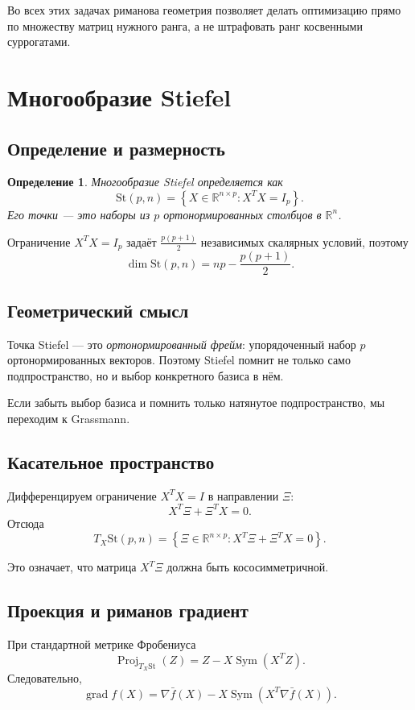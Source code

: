 \documentclass[12pt,a4paper]{article}
\theoremstyle{rudef}
\newtheorem{definition}{Определение}[section]
\theoremstyle{ruplain}
\newcommand{\R}{\mathbb{R}}
\newcommand{\grad}{\operatorname{grad}}
\newcommand{\Sym}{\operatorname{Sym}}
\newcommand{\Proj}{\operatorname{Proj}}
\newcommand{\St}{\mathrm{St}}
\newcommand{\set}[1]{\left\{#1\right\}}
\begin{document}
Во всех этих задачах риманова геометрия позволяет делать оптимизацию прямо по множеству матриц нужного ранга, а не штрафовать ранг косвенными суррогатами.

\section{Многообразие Stiefel}

\subsection{Определение и размерность}

\begin{definition}
Многообразие Stiefel определяется как
\[
\St(p,n)=\set{X\in \R^{n\times p}: X^TX=I_p}.
\]
Его точки --- это наборы из $p$ ортонормированных столбцов в $\R^n$.
\end{definition}

Ограничение $X^TX=I_p$ задаёт $\frac{p(p+1)}{2}$ независимых скалярных условий, поэтому
\[
\dim \St(p,n)=np-\frac{p(p+1)}{2}.
\]

\subsection{Геометрический смысл}

Точка Stiefel --- это \emph{ортонормированный фрейм}: упорядоченный набор $p$ ортонормированных векторов. Поэтому Stiefel помнит не только само подпространство, но и выбор конкретного базиса в нём.

Если забыть выбор базиса и помнить только натянутое подпространство, мы переходим к Grassmann.

\subsection{Касательное пространство}

Дифференцируем ограничение $X^TX=I$ в направлении $\Xi$:
\[
X^T\Xi + \Xi^T X = 0.
\]
Отсюда
\[
\boxed{\ T_X\St(p,n)=\set{\Xi\in \R^{n\times p}: X^T\Xi + \Xi^TX = 0}.\ }
\]

Это означает, что матрица $X^T\Xi$ должна быть кососимметричной.

\subsection{Проекция и риманов градиент}

При стандартной метрике Фробениуса
\[
\Proj_{T_X\St}(Z)=Z-X\Sym(X^TZ).
\]
Следовательно,
\[
\grad f(X)=\nabla \bar f(X)-X\Sym(X^T\nabla \bar f(X)).
\]
\end{document}
